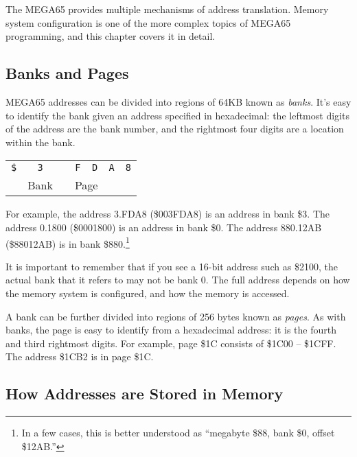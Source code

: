 The MEGA65 provides multiple mechanisms of address translation. Memory
system configuration is one of the more complex topics of MEGA65 programming,
and this chapter covers it in detail.

\subsection{Banks and Pages}

MEGA65 addresses can be divided into regions of 64KB known as {\em banks}.
It's easy to identify the bank given an address specified in hexadecimal: the
leftmost digits of the address are the bank number, and the rightmost four
digits are a location within the bank.

\medskip
\begin{center}
\begin{tabular}{m{0.4cm}m{0.4cm}m{0.05cm}m{0.4cm}m{0.4cm}m{0.4cm}m{0.4cm}}
\multicolumn{1}{c}{\huge\texttt{\$}} &
\multicolumn{1}{c}{\huge\texttt{3}} &
\multicolumn{1}{c}{ } &
\multicolumn{1}{c}{\huge\texttt{F}} &
\multicolumn{1}{c}{\huge\texttt{D}} &
\multicolumn{1}{c}{\huge\texttt{A}} &
\multicolumn{1}{c}{\huge\texttt{8}} \\
\cline{2-2}\cline{4-5}
& \multicolumn{1}{c}{\small Bank} & & \multicolumn{2}{c}{\small Page} &
\multicolumn{2}{c}{ } \\
\end{tabular}
\end{center}
\medskip

For example, the address 3.FDA8 (\$003FDA8) is an address in bank \$3. The
address 0.1800 (\$0001800) is an address in bank \$0. The address 880.12AB
(\$88012AB) is in bank \$880.\footnote{In a few cases, this is better understood as
``megabyte \$88, bank \$0, offset \$12AB.''}

It is important to remember that if you see a 16-bit
address such as \$2100, the actual bank that it refers to may not be bank 0.
The full address depends on how the memory system is configured, and how the
memory is accessed.

A bank can be further divided into regions of 256 bytes known as {\em pages}.
As with banks, the page is easy to identify from a hexadecimal address: it is
the fourth and third rightmost digits. For example, page \$1C consists of
\$1C00 -- \$1CFF. The address \$1CB2 is in page \$1C.

\subsection{How Addresses are Stored in Memory}

